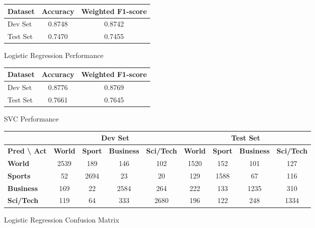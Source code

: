 \documentclass[12pt,a4paper,english]{article}
\begin{document}
\begin{figure}[htbp]
    \centering
    \setlength{\tabcolsep}{3pt}
    
    \begin{subtable}[b]{0.48\textwidth}
        \centering
        \begin{tabular}{|l|c|c|}
        \hline
        \textbf{Dataset} & \textbf{Accuracy} & \textbf{Weighted F1-score} \\ \hline
        Dev Set  & 0.8748 & 0.8742 \\ \hline
        Test Set & 0.7470 & 0.7455 \\ \hline
        \end{tabular}
        \caption{Logistic Regression Performance}
        \label{subtab:lr_perf}
    \end{subtable}
    \hfill
    \begin{subtable}[b]{0.48\textwidth}
        \centering
        \begin{tabular}{|l|c|c|}
        \hline
        \textbf{Dataset} & \textbf{Accuracy} & \textbf{Weighted F1-score} \\ \hline
        Dev Set  & 0.8776 & 0.8769 \\ \hline
        Test Set & 0.7661 & 0.7645 \\ \hline
        \end{tabular}
        \caption{SVC Performance}
        \label{subtab:svc_perf}
    \end{subtable}

    \vspace{0.6cm}

    \begin{subtable}[b]{1\textwidth}
        \centering
        \begin{tabular}{|l|cccc|cccc|}
        \hline
         & \multicolumn{4}{c|}{\textbf{Dev Set}} & \multicolumn{4}{c|}{\textbf{Test Set}} \\ \hline
        \textbf{Pred \textbackslash{} Act} & \textbf{World} & \textbf{Sport} & \textbf{Business} & \textbf{Sci/Tech} & \textbf{World} & \textbf{Sport} & \textbf{Business} & \textbf{Sci/Tech} \\ \hline
        \textbf{World}    & 2539 & 189 & 146 & 102 & 1520 & 152 & 101 & 127 \\
        \textbf{Sports}   & 52   & 2694 & 23  & 20  & 129  & 1588 & 67  & 116 \\
        \textbf{Business} & 169  & 22   & 2584 & 264 & 222  & 133  & 1235 & 310 \\
        \textbf{Sci/Tech} & 119  & 64   & 333  & 2680 & 196  & 122  & 248  & 1334 \\ \hline
        \end{tabular}
        \caption{Logistic Regression Confusion Matrix}
        \label{subtab:lr_cm}
    \end{subtable}


\end{figure}
\end{document}
